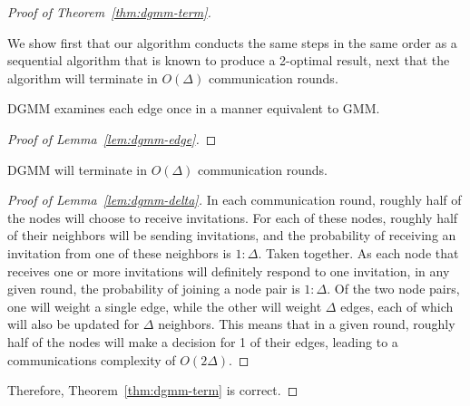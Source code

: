 \begin{proof}[Proof of Theorem~\ref{thm:dgmm-term}]
\label{prf:correct}
\begin{smy}
We show first that our algorithm conducts the same steps in the same order as a sequential algorithm that is known to produce a 2-optimal result, next that the algorithm will terminate in $O(\Delta)$ communication rounds.
\end{smy} 

\begin{lem}
\label{lem:dgmm-edge}
  DGMM examines each edge once in a manner equivalent to GMM.
\end{lem}
\begin{proof}[Proof of Lemma~\ref{lem:dgmm-edge}]

\end{proof}

\begin{lem}
  \label{lem:dgmm-delta}
  DGMM will terminate in $O(\Delta)$ communication rounds.
\end{lem}
\begin{proof}[Proof of Lemma~\ref{lem:dgmm-delta}]
In each communication round, roughly half of the nodes will choose to receive invitations. For each of these nodes, roughly half of their neighbors will be sending invitations, and the probability of receiving an invitation from one of these neighbors is $1:\Delta$. Taken together. As each node that receives one or more invitations will definitely respond to one invitation, in any given round, the probability of joining a node pair is $1:\Delta$. Of the two node pairs, one will weight a single edge, while the other will weight $\Delta$ edges, each of which will also be updated for $\Delta$ neighbors. This means that in a given round, roughly half of the nodes will make a decision for 1 of their edges, leading to a communications complexity of $O(2\Delta)$.
\end{proof}

Therefore, Theorem~\ref{thm:dgmm-term} is correct.
\end{proof}
